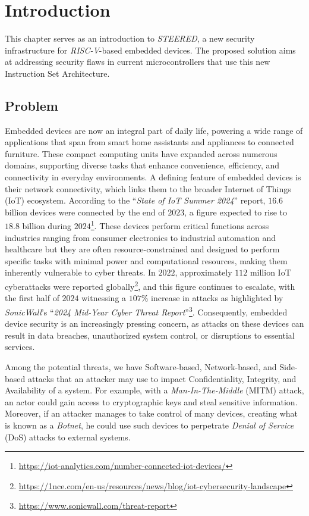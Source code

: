 \chapter{Introduction}
\label{cha:introduction}

This chapter serves as an introduction to \textit{STEERED}, a new security
infrastructure for \textit{RISC-V}-based embedded devices. The proposed solution
aims at addressing security flaws in current microcontrollers that use this new
Instruction Set Architecture.

\section{Problem}
\label{sec:intro_context}

Embedded devices are now an integral part of daily life, powering a wide range
of applications that span from smart home assistants and appliances to connected
furniture. These compact computing units have expanded across numerous domains,
supporting diverse tasks that enhance convenience, efficiency, and connectivity
in everyday environments. A defining feature of embedded devices is their network
connectivity, which links them to the broader Internet of Things (IoT) ecosystem.
According to the ``\textit{State of IoT Summer 2024}'' report, $16.6$ billion devices
were connected by the end of $2023$, a figure expected to rise to $18.8$ billion
during $2024$\footnote{\url{https://iot-analytics.com/number-connected-iot-devices/}}.
These devices perform critical functions across industries ranging from consumer
electronics to industrial automation and healthcare but they are often resource-constrained
and designed to perform specific tasks with minimal power and computational
resources, making them inherently vulnerable to cyber threats. In $2022$, approximately
$112$ million IoT cyberattacks were reported globally\footnote{\url{https://1nce.com/en-us/resources/news/blog/iot-cybersecurity-landscape}},
and this figure continues to escalate, with the first half of $2024$ witnessing
a $107\%$ increase in attacks as highlighted by \textit{SonicWall}'s ``\textit{2024
Mid-Year Cyber Threat Report}''\footnote{\url{https://www.sonicwall.com/threat-report}}.
Consequently, embedded device security is an increasingly pressing concern, as
attacks on these devices can result in data breaches, unauthorized system control,
or disruptions to essential services.

Among the potential threats, we have Software-based, Network-based, and Side-based
attacks that an attacker may use to impact Confidentiality, Integrity, and Availability
of a system. For example, with a \textit{Man-In-The-Middle} (MITM) attack, an actor
could gain access to cryptographic keys and steal sensitive information.
Moreover, if an attacker manages to take control of many devices, creating what
is known as a \textit{Botnet}, he could use such devices to perpetrate \textit{Denial
of Service} (DoS) attacks to external systems.

